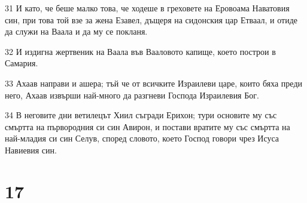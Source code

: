 \par 31 И като, че беше малко това, че ходеше в греховете на Еровоама Наватовия син, при това той взе за жена Езавел, дъщеря на сидонския цар Етваал, и отиде да служи на Ваала и да му се покланя.
\par 32 И издигна жертвеник на Ваала във Вааловото капище, което построи в Самария.
\par 33 Ахаав направи и ашера; тъй че от всичките Израилеви царе, които бяха преди него, Ахаав извърши най-много да разгневи Господа Израилевия Бог.
\par 34 В неговите дни ветилецът Хиил съгради Ерихон; тури основите му със смъртта на първородния си син Авирон, и постави вратите му със смъртта на най-младия си син Селув, според словото, което Господ говори чрез Исуса Навиевия син.

\chapter{17}

